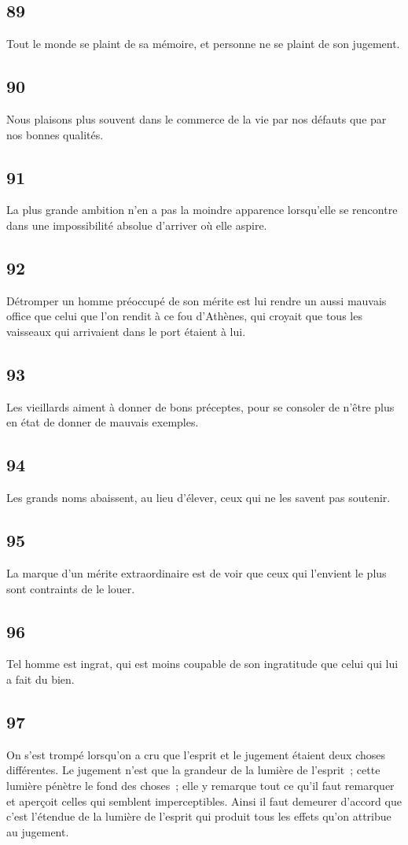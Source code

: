 \documentclass[french,twoside]{book} %
\begin{document}
\subsection[{89}]{ \textsc{89} }
\noindent Tout le monde se plaint de sa mémoire, et personne ne se plaint de son jugement.
\subsection[{90}]{ \textsc{90} }
\noindent Nous plaisons plus souvent dans le commerce de la vie par nos défauts que par nos bonnes qualités.
\subsection[{91}]{ \textsc{91} }
\noindent La plus grande ambition n’en a pas la moindre apparence lorsqu’elle se rencontre dans une impossibilité absolue d’arriver où elle aspire.
\subsection[{92}]{ \textsc{92} }
\noindent Détromper un homme préoccupé de son mérite est lui rendre un aussi mauvais office que celui que l’on rendit à ce fou d’Athènes, qui croyait que tous les vaisseaux qui arrivaient dans le port étaient à lui.
\subsection[{93}]{ \textsc{93} }
\noindent Les vieillards aiment à donner de bons préceptes, pour se consoler de n’être plus en état de donner de mauvais exemples.
\subsection[{94}]{ \textsc{94} }
\noindent Les grands noms abaissent, au lieu d’élever, ceux qui ne les savent pas soutenir.
\subsection[{95}]{ \textsc{95} }
\noindent La marque d’un mérite extraordinaire est de voir que ceux qui l’envient le plus sont contraints de le louer.
\subsection[{96}]{ \textsc{96} }
\noindent Tel homme est ingrat, qui est moins coupable de son ingratitude que celui qui lui a fait du bien.
\subsection[{97}]{ \textsc{97} }
\noindent On s’est trompé lorsqu’on a cru que l’esprit et le jugement étaient deux choses différentes. Le jugement n’est que la grandeur de la lumière de l’esprit ; cette lumière pénètre le fond des choses ; elle y remarque tout ce qu’il faut remarquer et aperçoit celles qui semblent imperceptibles. Ainsi il faut demeurer d’accord que c’est l’étendue de la lumière de l’esprit qui produit tous les effets qu’on attribue au jugement.
\end{document}
